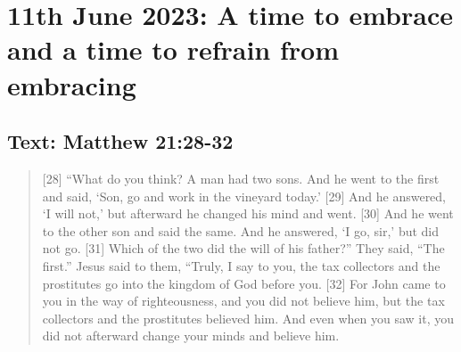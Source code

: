 \setcounter{figure}{0}

\section{11th June 2023: A time to embrace and a time to refrain from embracing}
\subsection*{Text: Matthew 21:28-32}
  \begin{quote}
    [28] “What do you think? A man had two sons. And he went to the first and said, ‘Son, go and work in the vineyard today.’ [29] And he answered, ‘I will not,’ but afterward he changed his mind and went. [30] And he went to the other son and said the same. And he answered, ‘I go, sir,’ but did not go. [31] Which of the two did the will of his father?” They said, “The first.” Jesus said to them, “Truly, I say to you, the tax collectors and the prostitutes go into the kingdom of God before you. [32] For John came to you in the way of righteousness, and you did not believe him, but the tax collectors and the prostitutes believed him. And even when you saw it, you did not afterward change your minds and believe him.
  \end{quote}
